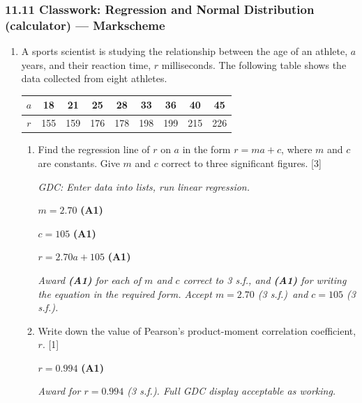 \documentclass[12pt, twoside]{article}
\begin{document}
\subsubsection*{11.11 Classwork: Regression and Normal Distribution (calculator) --- Markscheme}

\begin{enumerate}[itemsep=0.15cm]

\item[1.] [Maximum mark: 7]

A sports scientist is studying the relationship between the age of an athlete, $a$ years,
and their reaction time, $r$ milliseconds. The following table shows the data collected
from eight athletes.

\renewcommand{\arraystretch}{1.2}
\begin{center}
\begin{tabular}{|c|c|c|c|c|c|c|c|c|}
\hline
$a$ & 18 & 21 & 25 & 28 & 33 & 36 & 40 & 45 \\
\hline
$r$ & 155 & 159 & 176 & 178 & 198 & 199 & 215 & 226 \\
\hline
\end{tabular}
\end{center}
\renewcommand{\arraystretch}{1.0}

\begin{enumerate}[itemsep=0.3cm]
  \item[(a)] Find the regression line of $r$ on $a$ in the form $r = ma + c$,
  where $m$ and $c$ are constants.
  Give $m$ and $c$ correct to three significant figures. \hfill [3]

  \textit{GDC: Enter data into lists, run linear regression.}

  $m = 2.70$ \hfill \textbf{(A1)}

  $c = 105$ \hfill \textbf{(A1)}

  $r = 2.70a + 105$ \hfill \textbf{(A1)}

  \textit{Award \textbf{(A1)} for each of $m$ and $c$ correct to 3 s.f.,
  and \textbf{(A1)} for writing the equation in the required form.
  Accept $m = 2.70$ (3 s.f.)\ and $c = 105$ (3 s.f.).}

  \item[(b)] Write down the value of Pearson's product-moment correlation
  coefficient, $r$. \hfill [1]

  $r = 0.994$ \hfill \textbf{(A1)}

  \textit{Award for $r = 0.994$ (3 s.f.). Full GDC display acceptable as working.}


\end{enumerate}
\end{enumerate}
\end{document}
